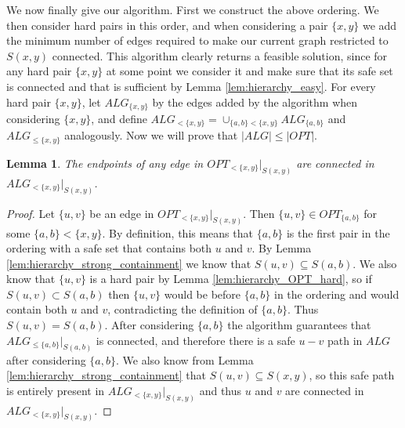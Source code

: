 \documentclass[11pt,letterpaper]{article}
\newtheorem{lemma}[theorem]{Lemma}
\theoremstyle{definition}
\begin{document}
We now finally give our algorithm.  First we construct the above
ordering.  We then consider hard pairs in this order, and when
considering a pair $\{x,y\}$ we add the minimum number of edges
required to make our current graph restricted to $S(x,y)$ connected.
This algorithm clearly returns a feasible solution, since for any hard
pair $\{x,y\}$ at some point we consider it and make sure that its
safe set is connected and that is sufficient by Lemma
\ref{lem:hierarchy_easy}.  For every hard pair $\{x,y\}$, let
$ALG_{\{x,y\}}$ by the edges added by the algorithm when considering
$\{x,y\}$, and define $ALG_{<\{x,y\}} = \cup_{\{a,b\} < \{x,y\}}
ALG_{\{a,b\}}$ and $ALG_{\leq \{x,y\}}$ analogously.  Now we will
prove that $|ALG| \leq |OPT|$.

\begin{lemma} \label{lem:hierarchy_OPT_ALG}
  The endpoints of any edge in $OPT_{< \{x,y\}}|_{S(x,y)}$ are
  connected in $ALG_{< \{x,y\}}|_{S(x,y)}$.
\end{lemma}
\begin{proof}
  Let $\{u,v\}$ be an edge in $OPT_{< \{x,y\}}|_{S(x,y)}$.  Then
  $\{u,v\} \in OPT_{\{a,b\}}$ for some $\{a,b\} < \{x,y\}$.  By
  definition, this means that $\{a,b\}$ is the first pair in the
  ordering with a safe set that contains both $u$ and $v$.  By Lemma
  \ref{lem:hierarchy_strong_containment} we know that $S(u,v)
  \subseteq S(a,b)$.  We also know that $\{u,v\}$ is a hard pair by
  Lemma \ref{lem:hierarchy_OPT_hard}, so if $S(u,v) \subset S(a,b)$
  then $\{u,v\}$ would be before $\{a,b\}$ in the ordering and would
  contain both $u$ and $v$, contradicting the definition of $\{a,b\}$.
  Thus $S(u,v) = S(a,b)$.  After considering $\{a,b\}$ the algorithm
  guarantees that $ALG_{\leq \{a,b\}}|_{S(a,b)}$ is connected, and
  therefore there is a safe $u-v$ path in $ALG$ after considering
  $\{a,b\}$.  We also know from Lemma
  \ref{lem:hierarchy_strong_containment} that $S(u,v) \subseteq
  S(x,y)$, so this safe path is entirely present in $ALG_{<
    \{x,y\}}|_{S(x,y)}$ and thus $u$ and $v$ are connected in $ALG_{<
    \{x,y\}}|_{S(x,y)}$.
\end{proof}
\end{document}
